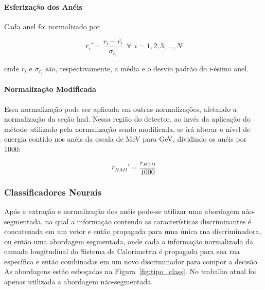 \paragraph{Esferização dos Anéis}

Cada anel foi normalizado por

\begin{equation}
r_{i}' = \frac{r_i - \bar{r_i}}{\sigma_{r_i }}~~\forall~~i=1,2,3,...,N
\end{equation}

\noindent onde $\bar{r_i}$ e $\sigma_{r_i }$ são, respectivamente, a média e o desvio 
padrão do i-ésimo anel. 

\paragraph{Normalização Modificada}

Essa normalização pode ser aplicada em outras normalizações, afetando a
normalização da seção \gls{had}. Nessa região do detector, ao invés da aplicação
do método utilizado pela normalização sendo modificada, se irá alterar o nível de energia 
contido nos anéis da escala de MeV para GeV, dividindo os anéis por 1000:

\begin{equation}
r_{HAD}' =   \frac{r_{HAD}}{1000}
\end{equation}



\subsubsection{Classificadores Neurais}
\label{sssec:rna}

Após a extração e normalização dos anéis pode-se utilizar uma abordagem não-segmentada, 
na qual a informação contendo as características discriminantes é concatenada em um vetor 
e então propagada para uma única \gls{rna} discriminadora, ou então uma abordagem segmentada, 
onde cada a informação normalizada da camada longitudinal do Sistema de Calorimetria é 
propagada para sua \gls{rna} específica e então combinadas em um novo
discriminador para compor a decisão. As abordagens estão esboçadas na
Figura~\ref{fig:tipo_class}. No trabalho atual foi apenas utilizada a abordagem 
não-segmentada.

